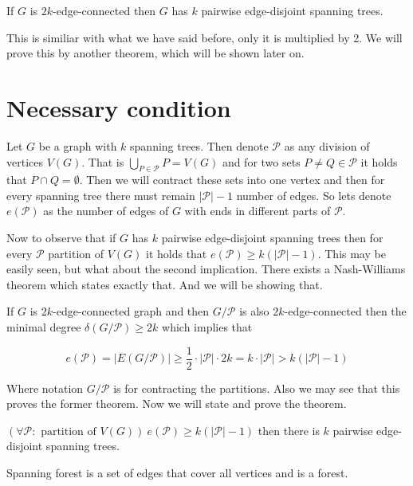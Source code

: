 \begin{thm}
	If $G$ is $2k$-edge-connected then $G$ has $k$ pairwise edge-disjoint spanning trees.
\end{thm}

This is similiar with what we have said before, only it is multiplied by 2. We will prove this by another theorem, which will be shown later on.

\section{Necessary condition}

Let $G$ be a graph with $k$ spanning trees. Then denote $\mathcal{P}$ as any division of vertices $V(G)$. That is $\bigcup_{P \in \mathcal{P}} P = V(G)$ and for two sets $P \neq Q \in \mathcal{P}$ it holds that $P \cap Q = \emptyset$. Then we will contract these sets into one vertex and then for every spanning tree there must remain $|\mathcal{P}| -1$ number of edges. So lets denote $e(\mathcal{P})$ as the number of edges of $G$ with ends in different parts of $\mathcal{P}$.

Now to observe that if $G$ has $k$ pairwise edge-disjoint spanning trees then for every $\mathcal{P}$ partition of $V(G)$ it holds that $e(\mathcal{P}) \geq k (|\mathcal{P}| - 1)$. This may be easily seen, but what about the second implication. There exists a Nash-Williams theorem which states exactly that. And we will be showing that.

\begin{observ}
	If $G$ is $2k$-edge-connected graph and then $G/\mathcal{P}$ is also $2k$-edge-connected then the minimal degree $\delta(G/\mathcal{P}) \geq 2k$ which implies that
	
	$$
	e(\mathcal{P}) = |E(G/\mathcal{P})| \geq \frac{1}{2} \cdot |\mathcal{P}| \cdot 2k = k \cdot |\mathcal{P}| > k (|\mathcal{P}| - 1)
	$$
\end{observ}

Where notation $G / \mathcal{P}$ is for contracting the partitions. Also we may see that this proves the former theorem. Now we will state and prove the theorem.

\begin{thm}
	$(\forall \mathcal{P} : \text{ partition of } V(G)) \ e(\mathcal{P}) \geq k (|\mathcal{P}| - 1)$ then there is $k$ pairwise edge-disjoint spanning trees.
\end{thm}

\begin{defn}
	Spanning forest is a set of edges that cover all vertices and is a forest.
\end{defn}

